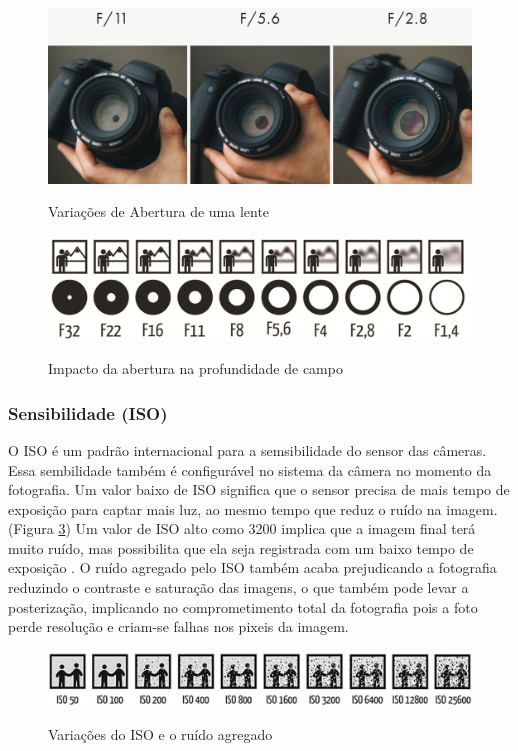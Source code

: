 \begin{figure}[!htb]
	\centering
	\caption{Variações de Abertura de uma lente}
	\includegraphics[width=0.7\linewidth]{figuras/abertura}
	\label{fig:abertura}
\end{figure}

\begin{figure}[h]
	\centering
	\caption{Impacto da abertura na profundidade de campo}
	\includegraphics[width=0.7\linewidth]{figuras/profundidade}
	\label{fig:profundidade}
\end{figure}

\subsubsection{Sensibilidade (ISO)}

O ISO é um padrão internacional para a semsibilidade do sensor das câmeras. Essa sembilidade também é configurável no sistema da câmera no momento da fotografia. Um valor baixo de ISO significa que o sensor precisa de mais tempo de exposição para captar mais luz, ao mesmo tempo que reduz o ruído na imagem. (Figura \ref{fig:iso})
Um valor de ISO alto como 3200 implica que a imagem final terá muito ruído, mas possibilita que ela seja registrada com um baixo tempo de exposição \cite{book:bbcsky}. O ruído agregado pelo ISO também acaba prejudicando a fotografia reduzindo o contraste e saturação das imagens, o que também pode levar a posterização, implicando no comprometimento total da fotografia pois a foto perde resolução e criam-se falhas nos pixeis da imagem.


\begin{figure}[!htb]
	\centering
	\caption{Variações do ISO e o ruído agregado}
	\includegraphics[width=0.7\linewidth]{figuras/ISO}
	\label{fig:iso}
\end{figure}

